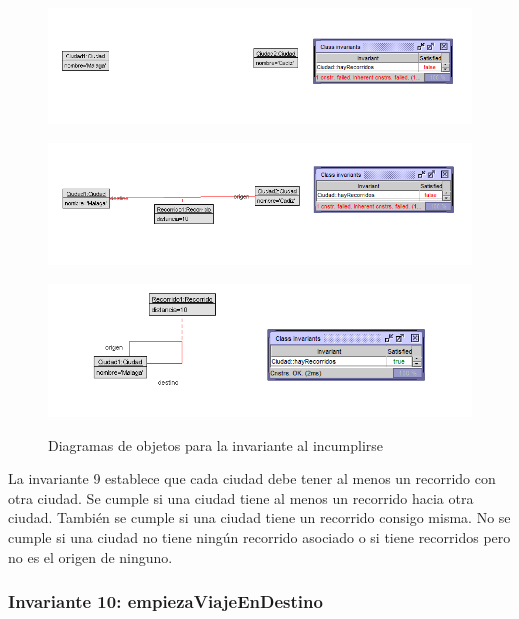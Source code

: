 \documentclass[12pt.a4paper]{article}
\begin{document}
  \begin{figure}[H]
    \centering
    \begin{minipage}{0.49\textwidth}
        \centering
        \includegraphics[width=\linewidth]{Soils/9_v2.png}
        \label{fig:diagrama1}
    \end{minipage}
    \hfill
    \begin{minipage}{0.49\textwidth}
        \centering
        \includegraphics[width=\linewidth]{Soils/9_v3.png}
        \label{fig:diagrama2}
    \end{minipage}
    \hfill
        \centering
        \includegraphics[width=0.7\linewidth]{Soils/9_v4.png}
        \label{fig:diagrama3}
    \caption{Diagramas de objetos para la invariante al incumplirse}
    \label{fig:Diagrama_incumplimiento}
\end{figure}

La invariante 9 establece que cada ciudad debe tener al menos un recorrido con otra ciudad. Se cumple si una ciudad tiene al menos un recorrido hacia otra ciudad. También se cumple si una ciudad tiene un recorrido consigo misma. No se cumple si una ciudad no tiene ningún recorrido asociado o si tiene recorridos pero no es el origen de ninguno.

\subsubsection{Invariante 10: empiezaViajeEnDestino}
\end{document}
